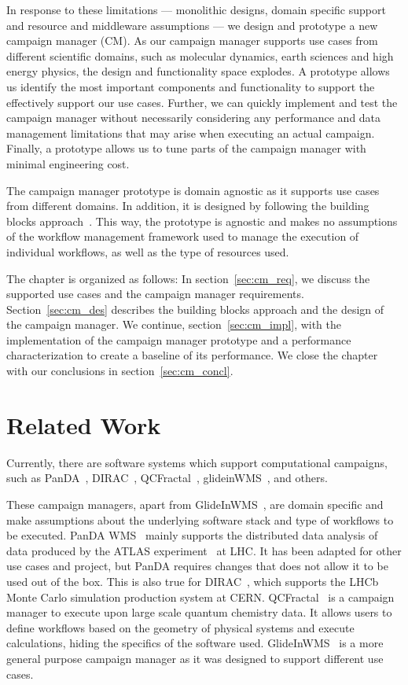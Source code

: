 In response to these limitations --- monolithic designs, domain specific support and resource and middleware assumptions --- we design and prototype a new campaign manager (CM).
As our campaign manager supports use cases from different scientific domains, such as molecular dynamics, earth sciences and high energy physics, the design and functionality space explodes.
A prototype allows us identify the most important components and functionality to support the effectively support our use cases.
Further, we can quickly implement and test the campaign manager without necessarily considering any performance and data management limitations that may arise when executing an actual campaign.
Finally, a prototype allows us to tune parts of the campaign manager with minimal engineering cost.

The campaign manager prototype is domain agnostic as it supports use cases from different domains.
In addition, it is designed by following the building blocks approach~\cite{turilli2019middleware}.
This way, the prototype is agnostic and makes no assumptions of the workflow management framework used to manage the execution of individual workflows, as well as the type of resources used.

The chapter is organized as follows:
In section~\ref{sec:cm_req}, we discuss the supported use cases and the campaign manager requirements.
Section~\ref{sec:cm_des} describes the building blocks approach and the design of the campaign manager.
We continue, section~\ref{sec:cm_impl}, with the implementation of the campaign manager prototype and a performance characterization to create a baseline of its performance.
We close the chapter with our conclusions in section~\ref{sec:cm_concl}.

\section{Related Work}
Currently, there are software systems which support computational campaigns, such as PanDA~\cite{maeno2008panda}, DIRAC~\cite{casajus2010dirac}, QCFractal~\cite{qcfractal}, glideinWMS~\cite{sfiligoi2008glidein}, and others.

These campaign managers, apart from GlideInWMS~\cite{sfiligoi2008glidein}, are domain specific and make assumptions about the underlying software stack and type of workflows to be executed.
PanDA WMS~\cite{maeno2008panda} mainly supports the distributed data analysis of data produced by the ATLAS experiment~\cite{atlas} at LHC.
It has been adapted for other use cases and project, but PanDA requires changes that does not allow it to be used out of the box.
This is also true for DIRAC~\cite{tsaregorodtsev2003dirac}, which supports the LHCb Monte Carlo simulation production system at CERN.
QCFractal~\cite{qcfractal} is a campaign manager to execute upon large scale quantum chemistry data.
It allows users to define workflows based on the geometry of physical systems and execute calculations, hiding the specifics of the software used.
GlideInWMS~\cite{sfiligoi2008glidein} is a more general purpose campaign manager as it was designed to support different use cases.

